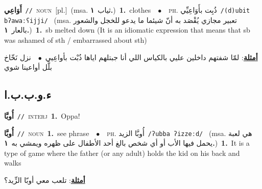 \documentclass[10pt,a4paper,twoside]{article} %
\begin{document}
\begin{multicols}{2}
{\setlength\topsep{0pt}\textbf{\foreignlanguage{arabic}{أَوَاعِي}}\ {\color{gray}\texttt{//}\color{black}}\ \textsc{noun}\ [pl.]\ \color{gray}(msa. \foreignlanguage{arabic}{ثياب}~\foreignlanguage{arabic}{\textbf{١.}})\color{black}\ \textbf{1.}~clothes\ \ $\bullet$\ \ \textsc{ph.} \color{gray} \foreignlanguage{arabic}{ذُبِت بأَوَاعِيِّي}\color{black}\ {\color{gray}\texttt{/{\sffamily (d)ubit bʔawaːʕijji}/}\color{black}}\ \color{gray} (msa. \foreignlanguage{arabic}{تعبير مجازي يُقْصَد به أنّ شيئما ما يدعو للخجل والشعور بالعار}~\foreignlanguage{arabic}{\textbf{١.}})\color{black}\ \textbf{1.}~sb melted down (It is an idiomatic expression that means that sb was ashamed of sth / embarrassed about sth)\  \begin{flushright}\color{gray}\foreignlanguage{arabic}{\textbf{\underline{\foreignlanguage{arabic}{أمثلة}}}: لمّا شفتهم داخلين عليي بالكياس اللي أنا جبتلهم اياها ذُبْت بأواعِيي\ $\bullet$\ \  نزل نَخّاخ بلَّل أواعينا شوي}\end{flushright}\color{black}} \vspace{2mm}

\vspace{-3mm}
\subsection*{\color{blue}\foreignlanguage{arabic}{ء.و.ب.ب.ا}\color{blue}{ (ntws)}} 

{\setlength\topsep{0pt}\textbf{\foreignlanguage{arabic}{أُوبَّا}}\ {\color{gray}\texttt{//}\color{black}}\ \textsc{interj}\ \textbf{1.}~Oppa!\ } \vspace{2mm}

{\setlength\topsep{0pt}\textbf{\foreignlanguage{arabic}{أُوبَّا}}\ {\color{gray}\texttt{//}\color{black}}\ \textsc{noun}\ \textbf{1.}~see phrase\ \ $\bullet$\ \ \textsc{ph.} \color{gray} \foreignlanguage{arabic}{أُوبَّا الزيد}\color{black}\ {\color{gray}\texttt{/{\sffamily ʔubba ʔizzeːd}/}\color{black}}\ \color{gray} (msa. \foreignlanguage{arabic}{هي لعبة يحمل فيها الأب أو أي شخص بالغ أحد الأطفال على ظهره ويمشي به}~\foreignlanguage{arabic}{\textbf{١.}})\color{black}\ \textbf{1.}~It is a type of game where the father (or any adult) holds the kid on his back and walks\  \begin{flushright}\color{gray}\foreignlanguage{arabic}{\textbf{\underline{\foreignlanguage{arabic}{أمثلة}}}: تلعب معي أوبّا الزِّيد؟}\end{flushright}\color{black}} \vspace{2mm}


\end{multicols}
\end{document}
